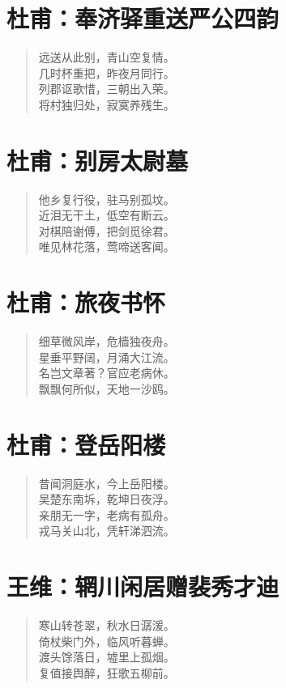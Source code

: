 \documentclass[12pt,oneside]{book}
\newenvironment{shici}{
\begin{verse}
\centering\large\hspace{12pt}}
{\end{verse}}
\begin{document}
\chapter{杜甫：奉济驿重送严公四韵}
\begin{shici}
远送从此别，青山空复情。\\
几时杯重把，昨夜月同行。\\
列郡讴歌惜，三朝出入荣。\\
将村独归处，寂寞养残生。
\end{shici}

\chapter{杜甫：别房太尉墓}
\begin{shici}
他乡复行役，驻马别孤坟。\\
近泪无干土，低空有断云。\\
对棋陪谢傅，把剑觅徐君。\\
唯见林花落，莺啼送客闻。
\end{shici}

\chapter{杜甫：旅夜书怀}
\begin{shici}
细草微风岸，危樯独夜舟。\\
星垂平野阔，月涌大江流。\\
名岂文章著？官应老病休。\\
飘飘何所似，天地一沙鸥。
\end{shici}

\chapter{杜甫：登岳阳楼}
\begin{shici}
昔闻洞庭水，今上岳阳楼。\\
吴楚东南坼，乾坤日夜浮。\\
亲朋无一字，老病有孤舟。\\
戎马关山北，凭轩涕泗流。
\end{shici}

\chapter{王维：辋川闲居赠裴秀才迪}
\begin{shici}
寒山转苍翠，秋水日潺湲。\\
倚杖柴门外，临风听暮蝉。\\
渡头馀落日，墟里上孤烟。\\
复值接舆醉，狂歌五柳前。
\end{shici}
\end{document}
